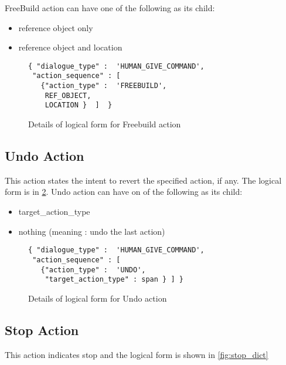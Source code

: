 FreeBuild action can have one of the following as its child:
\begin{itemize}
	\setlength\itemsep{0.0em}
	\item reference object only
	\item reference object and location
\end{itemize}


\begin{figure}[ht]
    \centering
    \fontsize{8pt}{8pt}\selectfont
    \begin{verbatim}
{ "dialogue_type" :  'HUMAN_GIVE_COMMAND',
 "action_sequence" : [
   {"action_type" :  'FREEBUILD',
    REF_OBJECT,
    LOCATION }  ]  }
    \end{verbatim}
    \vspace{-20pt}
    \caption{Details of logical form for Freebuild action}
    \vspace{-8pt}
    \label{fig:freebuild_dict}
\end{figure}


\subsection{ Undo Action}
This action states the intent to revert the specified action, if any. The logical form is in \ref{fig:undo_dict}.
Undo action can have on of the following as its child:
\begin{itemize}
	\setlength\itemsep{0.0em}
	\item target\_action\_type 
	\item nothing (meaning : undo the last action)
\end{itemize}

\begin{figure}[ht]
    \centering
    \fontsize{8pt}{8pt}\selectfont
    \begin{verbatim}
{ "dialogue_type" :  'HUMAN_GIVE_COMMAND',
 "action_sequence" : [
   {"action_type" :  'UNDO',
    "target_action_type" : span } ] }
    \end{verbatim}
    \vspace{-20pt}
    \caption{Details of logical form for Undo action}
    \vspace{-8pt}
    \label{fig:undo_dict}
\end{figure}


\subsection{ Stop Action}
This action indicates stop and the logical form is shown in \ref{fig:stop_dict}

